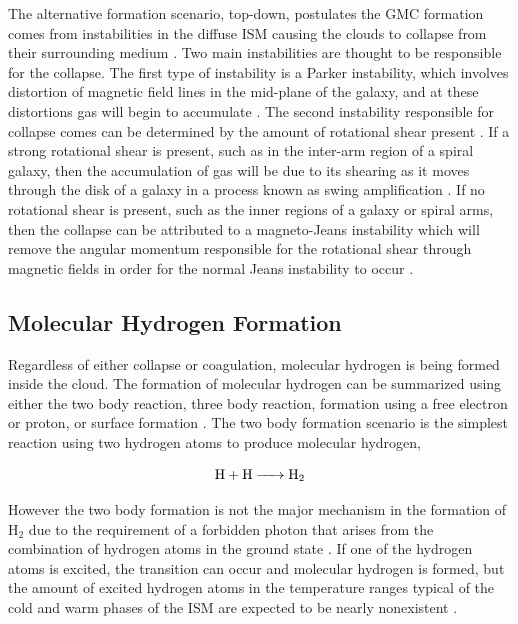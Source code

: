 The alternative formation scenario, top-down, postulates the GMC formation comes from instabilities in the diffuse ISM causing the clouds to collapse from their surrounding medium \citep{mckee2007}.  Two main instabilities are thought to be responsible for the collapse.  The first type of instability is a Parker instability, which involves distortion of magnetic field lines in the mid-plane of the galaxy, and at these distortions gas will begin to accumulate \citep{parker1966, dobbs2013}.  The second instability responsible for collapse comes can be determined by the amount of rotational shear present \citep{mckee2007}.  If a strong rotational shear is present, such as in the inter-arm region of a spiral galaxy, then the accumulation of gas will be due to its shearing as it moves through the disk of a galaxy in a process known as swing amplification \citep{mckee2007, dobbs2013}.  If no rotational shear is present, such as the inner regions of a galaxy or spiral arms, then the collapse can be attributed to a magneto-Jeans instability which will remove the angular momentum responsible for the rotational shear through magnetic fields in order for the normal Jeans instability to occur \citep{elmegreen1987,kim2001}.

\subsection{Molecular Hydrogen Formation}\label{h2form}

Regardless of either collapse or coagulation, molecular hydrogen is being formed inside the cloud.  The formation of molecular hydrogen can be summarized using either the two body reaction, three body reaction, formation using a free electron or proton, or surface formation \citep{krumholz2014}.  The two body formation scenario is the simplest reaction using two hydrogen atoms to produce molecular hydrogen,

\begin{equation}\label{eq:2bod}
  \ce{H + H -> H_2}
\end{equation}

However the two body formation is not the major mechanism in the formation of H$_2$ due to the requirement of a forbidden photon that arises from the combination of hydrogen atoms in the ground state \citep{gould1963}.  If one of the hydrogen atoms is excited, the transition can occur and molecular hydrogen is formed, but the amount of excited hydrogen atoms in the temperature ranges typical of the cold and warm phases of the ISM are expected to be nearly nonexistent \citep{krumholz2014}.

